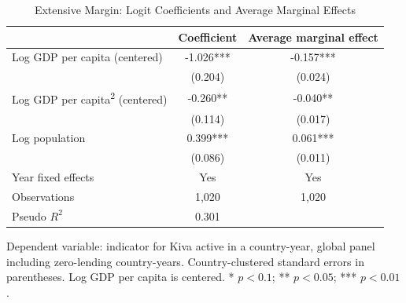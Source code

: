 \begin{table}[htbp]
\centering
\caption{Extensive Margin: Logit Coefficients and Average Marginal Effects}
\label{tab:table8}
\begin{tabular}{lcc}
\toprule
 & Coefficient & Average marginal effect \\
\midrule
Log GDP per capita (centered) & -1.026*** & -0.157*** \\
 & (0.204) & (0.024) \\
Log GDP per capita\textsuperscript{2} (centered) & -0.260** & -0.040** \\
 & (0.114) & (0.017) \\
Log population & 0.399*** & 0.061*** \\
 & (0.086) & (0.011) \\
\midrule
Year fixed effects & Yes & Yes \\
Observations & 1,020 & 1,020 \\
Pseudo $R^2$ & 0.301 & \\
\bottomrule
\end{tabular}
\par\smallskip\footnotesize Dependent variable: indicator for Kiva active in a country-year, global panel including zero-lending country-years. Country-clustered standard errors in parentheses. Log GDP per capita is centered. * $p<0.1$; ** $p<0.05$; *** $p<0.01$.
\end{table}